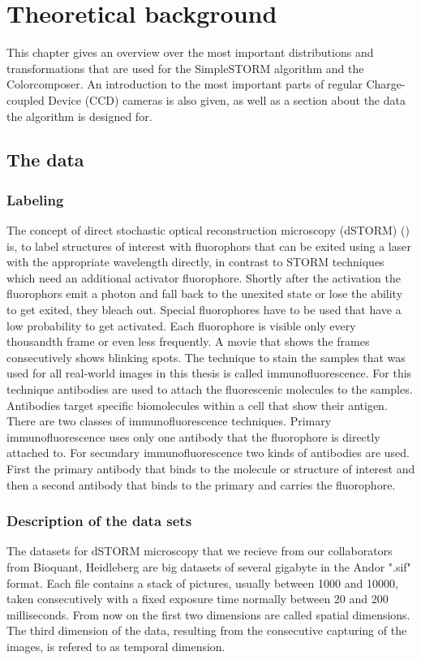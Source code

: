 \chapter{Theoretical background}
This chapter gives an overview over the most important distributions and transformations that are used for the SimpleSTORM algorithm and the Colorcomposer. An introduction to the most important parts of regular Charge-coupled Device (CCD) cameras is also given, as well as a section about the data the algorithm is designed for. 

\section{The data}
\subsection{Labeling}
The concept of direct stochastic optical reconstruction microscopy (dSTORM) (\cite{heilemann}) is, to label structures of interest with fluorophors that can be exited using a laser with the appropriate wavelength directly, in contrast to STORM techniques which need an additional activator fluorophore. Shortly after the activation the fluorophors emit a photon and fall back to the unexited state or lose the ability to get exited, they bleach out. Special fluorophores have to be used that have a low probability to get activated. Each fluorophore is visible only every thousandth frame or even less frequently. A movie that shows the frames consecutively shows blinking spots.\newline
The technique to stain the samples that was used for all real-world images in this thesis is called immunofluorescence. For this technique antibodies are used to attach the fluorescenic molecules to the samples. Antibodies target specific biomolecules within a cell that show their antigen. There are two classes of immunofluorescence techniques.\newline
Primary immunofluorescence uses only one antibody that the fluorophore is directly attached to.\newline
For secundary immunofluorescence two kinds of antibodies are used. First the primary antibody that binds to the molecule or structure of interest and then a second antibody that binds to the primary and carries the fluorophore.

\subsection{Description of the data sets}
The datasets for dSTORM microscopy that we recieve from our collaborators from
Bioquant, Heidleberg are big datasets of several gigabyte in the Andor ".sif" format. Each
file contains a stack of pictures, usually between 1000 and 10000, taken
consecutively with a fixed exposure time normally between 20 and 200 milliseconds. From now on the first two dimensions are called spatial dimensions. The third dimension of the data, resulting from the consecutive capturing of the images, is refered to as temporal dimension.\newline

